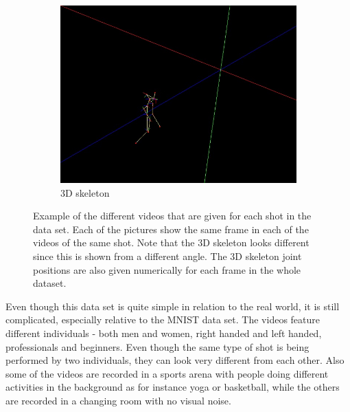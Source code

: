 \begin{figure}
\begin{subfigure}{.32\linewidth}
        \includegraphics[width=\linewidth]{Pics/04_Data/frame53_skelet3D.jpg}
        \caption{3D skeleton}
    \end{subfigure}
    \caption{Example of the different videos that are given for each shot in the data set. Each of the pictures show the same frame in each of the videos of the same shot. Note that the 3D skeleton looks different since this is shown from a different angle. The 3D skeleton joint positions are also given numerically for each frame in the whole dataset.}
    \label{fig:exampleVideosTennis}
\end{figure}

Even though this data set is quite simple in relation to the real world, it is still complicated, especially relative to the MNIST data set. The videos feature different individuals - both men and women, right handed and left handed, professionals and beginners. Even though the same type of shot is being performed by two individuals, they can look very different from each other. Also some of the videos are recorded in a sports arena with people doing different activities in the background as for instance yoga or basketball, while the others are recorded in a changing room with no visual noise.

